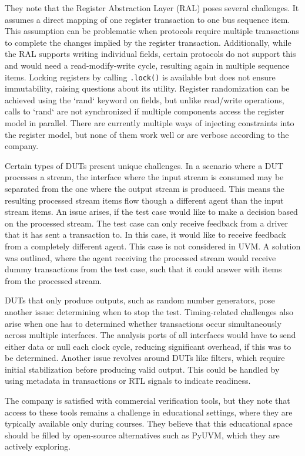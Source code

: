 \documentclass[11pt,a4paper]{report}
\newcommand{\ttt}{\texttt}
\begin{document}
They note that the Register Abstraction Layer (RAL) poses several challenges. It assumes a direct mapping of one
register transaction to one bus sequence item. This assumption can be problematic when protocols require multiple
transactions to complete the changes implied by the register transaction. Additionally, while the RAL supports
writing individual fields, certain protocols do not support this and would need a read-modify-write cycle, resulting
again in multiple sequence items. Locking registers by calling \ttt{.lock()} is available but does not ensure
immutability, raising questions
about its utility. Register randomization can be achieved using the `rand` keyword on fields, but unlike read/write
operations, calls to `rand` are not synchronized if multiple components access the register model in parallel. There
are currently multiple ways of injecting constraints into the register model, but none of them work well or are
verbose according to the company.

Certain types of DUTs present unique challenges. In a scenario where a DUT processes a stream, the interface where
the input stream is consumed may be separated from the one where the output stream is produced. This means the
resulting processed stream items flow though a different agent than the input stream items. An issue arises, if the
test case would like to make a decision based on the processed stream. The test case can only receive feedback from a
driver that it has sent a transaction to. In this case, it would like to receive feedback from a completely different
agent. This case is not considered in UVM. A solution was outlined, where the agent receiving the processed stream
would receive dummy transactions from the test case, such that it could answer with items from the processed stream.

DUTs that only produce outputs, such as random number generators, pose another issue: determining when to stop the
test. Timing-related challenges also arise when one has to determined whether transactions occur simultaneously
across multiple interfaces. The analysis ports of all interfaces would have to send either data or null each clock
cycle, reducing significant overhead, if this was to be determined. Another issue revolves around DUTs like filters,
which require initial stabilization before producing valid output. This could be handled by using metadata in
transactions or RTL signals to indicate readiness.

The company is satisfied with commercial verification tools, but they note that access to these tools remains a
challenge in educational settings, where they are typically available only during courses. They believe that this
educational space should be filled by open-source alternatives such as PyUVM, which they are actively exploring.
\end{document}
